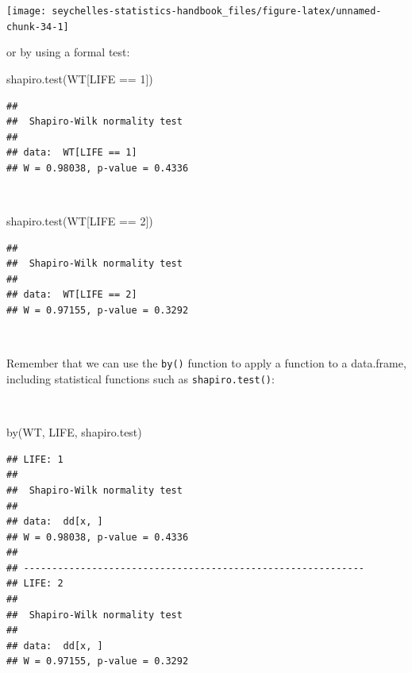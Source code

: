 \documentclass[
  12pt,
]{book}
\newenvironment{Shaded}{\begin{snugshade}}{\end{snugshade}}
\newcommand{\DecValTok}[1]{\textcolor[rgb]{0.00,0.00,0.81}{#1}}
\newcommand{\FunctionTok}[1]{\textcolor[rgb]{0.00,0.00,0.00}{#1}}
\newcommand{\NormalTok}[1]{#1}
\newcommand{\SpecialCharTok}[1]{\textcolor[rgb]{0.00,0.00,0.00}{#1}}
\begin{document}
\begin{center}\texttt{[image: seychelles-statistics-handbook\_files/figure-latex/unnamed-chunk-34-1]} \end{center}

\newpage

or by using a formal test:

\begin{Shaded}
\begin{Highlighting}[]
\FunctionTok{shapiro.test}\NormalTok{(WT[LIFE }\SpecialCharTok{==} \DecValTok{1}\NormalTok{])}
\end{Highlighting}
\end{Shaded}

\begin{verbatim}
## 
##  Shapiro-Wilk normality test
## 
## data:  WT[LIFE == 1]
## W = 0.98038, p-value = 0.4336
\end{verbatim}

~

\begin{Shaded}
\begin{Highlighting}[]
\FunctionTok{shapiro.test}\NormalTok{(WT[LIFE }\SpecialCharTok{==} \DecValTok{2}\NormalTok{])}
\end{Highlighting}
\end{Shaded}

\begin{verbatim}
## 
##  Shapiro-Wilk normality test
## 
## data:  WT[LIFE == 2]
## W = 0.97155, p-value = 0.3292
\end{verbatim}

~

Remember that we can use the \texttt{by()} function to apply a function to a data.frame, including statistical functions such as \texttt{shapiro.test()}:

~

\begin{Shaded}
\begin{Highlighting}[]
\FunctionTok{by}\NormalTok{(WT, LIFE, shapiro.test)}
\end{Highlighting}
\end{Shaded}

\begin{verbatim}
## LIFE: 1
## 
##  Shapiro-Wilk normality test
## 
## data:  dd[x, ]
## W = 0.98038, p-value = 0.4336
## 
## ------------------------------------------------------------ 
## LIFE: 2
## 
##  Shapiro-Wilk normality test
## 
## data:  dd[x, ]
## W = 0.97155, p-value = 0.3292
\end{verbatim}
\end{document}
